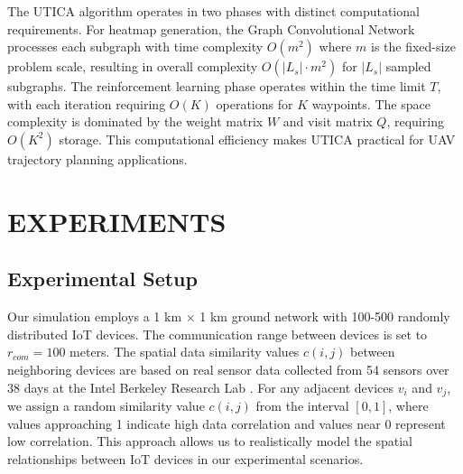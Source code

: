 \documentclass[sigconf]{acmart}
\begin{document}
The UTICA algorithm operates in two phases with distinct computational requirements. For heatmap generation, the Graph Convolutional Network processes each subgraph with time complexity $O(m^2)$ where $m$ is the fixed-size problem scale, resulting in overall complexity $O(|L_s| \cdot m^2)$ for $|L_s|$ sampled subgraphs. The reinforcement learning phase operates within the time limit $T$, with each iteration requiring $O(K)$ operations for $K$ waypoints. The space complexity is dominated by the weight matrix $W$ and visit matrix $Q$, requiring $O(K^2)$ storage. This computational efficiency makes UTICA practical for UAV trajectory planning applications.




\section{EXPERIMENTS}
\subsection{Experimental Setup}
Our simulation employs a 1 km $\times$ 1 km ground network with 100-500 randomly distributed IoT devices. The communication range between devices is set to $r_{com}=100$ meters. The spatial data similarity values $c(i,j)$ between neighboring devices are based on real sensor data collected from 54 sensors over 38 days at the Intel Berkeley Research Lab \cite{14-IntelBerkeley2013}. For any adjacent devices $v_i$ and $v_j$, we assign a random similarity value $c(i,j)$ from the interval $[0, 1]$, where values approaching 1 indicate high data correlation and values near 0 represent low correlation. This approach allows us to realistically model the spatial relationships between IoT devices in our experimental scenarios.
\end{document}
